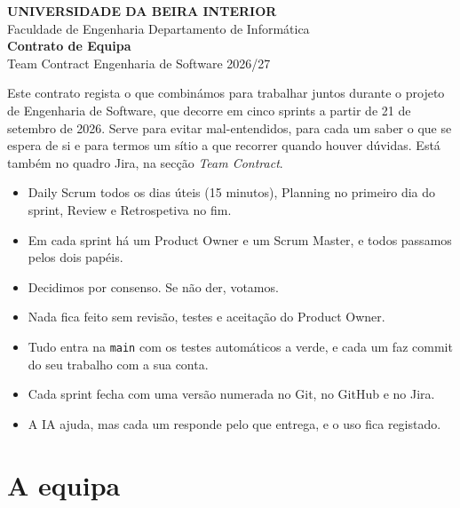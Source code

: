 \documentclass[11pt,a4paper]{article}
\begin{document}
\thispagestyle{primeira}

\begin{tcolorbox}[colback=azul, colframe=azul, coltext=white, arc=3pt, boxrule=0pt,
    left=16pt, right=16pt, top=14pt, bottom=14pt]
  \sffamily
  {\footnotesize\bfseries\MakeUppercase{Universidade da Beira Interior}}\\[2pt]
  {\footnotesize Faculdade de Engenharia \textperiodcentered{} Departamento de Informática}\\[16pt]
  {\fontsize{28}{32}\selectfont\bfseries Contrato de Equipa}\\[4pt]
  {\large Team Contract \textperiodcentered{} Engenharia de Software 2026/27}
\end{tcolorbox}

Este contrato regista o que combinámos para trabalhar juntos durante o projeto de Engenharia de Software, que decorre em cinco sprints a partir de 21 de setembro de 2026. Serve para evitar mal-entendidos, para cada um saber o que se espera de si e para termos um sítio a que recorrer quando houver dúvidas. Está também no quadro Jira, na secção \textit{Team Contract}.

\begin{tcolorbox}[caixa, title={Em resumo}, colback=azulclaro!60]
  \begin{itemize}
    \item Daily Scrum todos os dias úteis (15 minutos), Planning no primeiro dia do sprint, Review e Retrospetiva no fim.
    \item Em cada sprint há um Product Owner e um Scrum Master, e todos passamos pelos dois papéis.
    \item Decidimos por consenso. Se não der, votamos.
    \item Nada fica feito sem revisão, testes e aceitação do Product Owner.
    \item Tudo entra na \texttt{main} com os testes automáticos a verde, e cada um faz commit do seu trabalho com a sua conta.
    \item Cada sprint fecha com uma versão numerada no Git, no GitHub e no Jira.
    \item A IA ajuda, mas cada um responde pelo que entrega, e o uso fica registado.
  \end{itemize}
\end{tcolorbox}

\section*{A equipa}
\end{document}
